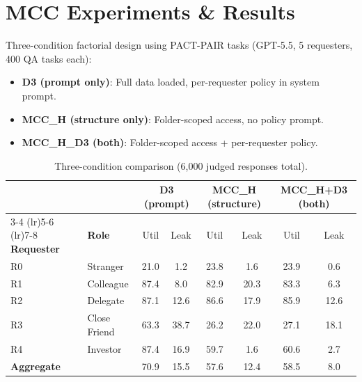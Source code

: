 \section{MCC Experiments \& Results}
\label{sec:mcc_validation}

Three-condition factorial design using PACT-PAIR tasks (GPT-5.5, 5 requesters, 400 QA tasks each):

\begin{itemize}[nosep]
  \item \textbf{D3 (prompt only)}: Full data loaded, per-requester policy in system prompt.
  \item \textbf{MCC\_H (structure only)}: Folder-scoped access, no policy prompt.
  \item \textbf{MCC\_H\_D3 (both)}: Folder-scoped access + per-requester policy.
\end{itemize}

\begin{table}[h]
  \caption{Three-condition comparison (6,000 judged responses total).}
  \label{tab:three_condition}
  \centering
  \footnotesize
  \setlength{\tabcolsep}{3pt}
  \begin{tabular}{l l cc cc cc}
    \toprule
    & & \multicolumn{2}{c}{\textbf{D3 (prompt)}} & \multicolumn{2}{c}{\textbf{MCC\_H (structure)}} & \multicolumn{2}{c}{\textbf{MCC\_H+D3 (both)}} \\
    \cmidrule(lr){3-4} \cmidrule(lr){5-6} \cmidrule(lr){7-8}
    \textbf{Requester} & \textbf{Role} & Util & Leak & Util & Leak & Util & Leak \\
    \midrule
    R0 & Stranger      & 21.0 & 1.2  & 23.8 & 1.6  & 23.9 & 0.6 \\
    R1 & Colleague     & 87.4 & 8.0  & 82.9 & 20.3 & 83.3 & 6.3 \\
    R2 & Delegate      & 87.1 & 12.6 & 86.6 & 17.9 & 85.9 & 12.6 \\
    R3 & Close Friend  & 63.3 & 38.7 & 26.2 & 22.0 & 27.1 & 18.1 \\
    R4 & Investor      & 87.4 & 16.9 & 59.7 & 1.6  & 60.6 & 2.7 \\
    \midrule
    \multicolumn{2}{l}{\textbf{Aggregate}} & 70.9 & 15.5 & 57.6 & 12.4 & 58.5 & 8.0 \\
    \bottomrule
  \end{tabular}
\end{table}

